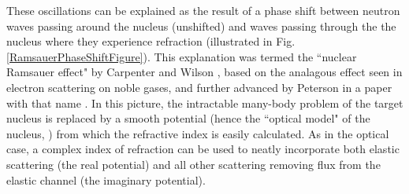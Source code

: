 \documentclass[twocolumn,secnumarabic,amssymb, nobibnotes, aps, prl,
superscriptaddress, nobalancelastpage]{revtex4}
\begin{document}
These oscillations can be explained as the result of a phase shift between 
neutron waves passing around the nucleus (unshifted) and waves passing
through the the nucleus where they experience refraction
(illustrated in Fig. \ref{RamsauerPhaseShiftFigure}). This explanation was termed the 
``nuclear Ramsauer effect" by Carpenter and Wilson \cite{Carpenter59}, based on the
analagous effect seen in electron scattering on noble gases, and further advanced by
Peterson in a paper with that name \cite{Peterson1962}.
In this picture, the intractable many-body
problem of the target nucleus is replaced by a smooth potential (hence the
``optical model" of the nucleus, \cite{Feshbach1958}) from which the refractive
index is easily calculated. As in the optical case, a complex index of
refraction can be used to neatly incorporate both elastic scattering (the real
potential) and all other scattering removing flux from the elastic channel (the imaginary potential).
\end{document}
